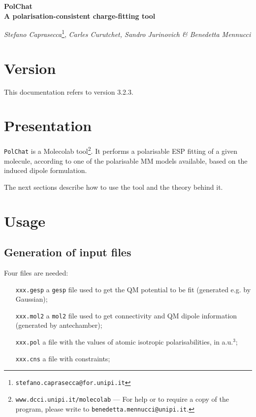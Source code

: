 \documentclass[a4paper]{report}
\begin{document}
\Large
\begin{center}
\textbf{PolChat \\ A polarisation-consistent charge-fitting tool}
\end{center}
\normalsize
\begin{center}
\emph{Stefano Caprasecca}\footnote{\texttt{stefano.caprasecca@for.unipi.it}},
\emph{Carles Curutchet, Sandro Jurinovich \& Benedetta Mennucci}
\end{center}

\section*{Version}

This documentation refers to version 3.2.3.

\section*{Presentation}

\texttt{PolChat} is a Molecolab tool\footnote{\texttt{www.dcci.unipi.it/molecolab} ---
For help or to require a copy of the program, please write to
\texttt{benedetta.mennucci@unipi.it}.}. It performs a
polarisable ESP fitting of a given molecule, according to one of the polarisable MM models available, based on the induced dipole formulation.

The next sections describe how to use the tool and the theory behind it.

\section*{Usage}

\subsection*{Generation of input files}

Four files are needed:
\begin{itemize}
\item[\texttt{xxx.gesp}] a \texttt{gesp} file used to get the QM potential to be fit
(generated e.g. by Gaussian);
\item[\texttt{xxx.mol2}] a \texttt{mol2} file used to get connectivity and QM dipole
information (generated by antechamber);
\item[\texttt{xxx.pol}] a file with the values of atomic isotropic polarisabilities,
in a.u.$^3$;
\item[\texttt{xxx.cns}] a file with constraints;
\end{itemize}
\end{document}

